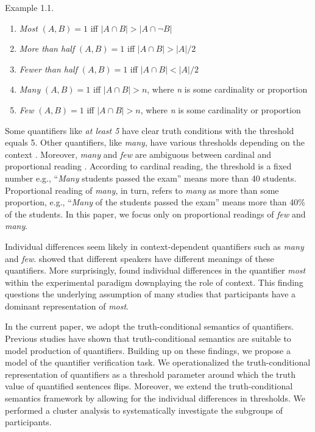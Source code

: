 \documentclass{article}
\begin{document}
\vspace{0.5cm}
Example 1.1.
\begin{enumerate} \label{ex:2.1} 
    \item \textit{Most} $(A, B) = 1$ iff $|A \cap B| > |A \cap \neg B|$
    \item \textit{More than half} $(A, B) = 1$ iff $|A \cap B| > |A|/2$
    \item \textit{Fewer than half} $(A, B) = 1$ iff $|A \cap B| < |A|/2$
    \item \textit{Many} $(A, B) = 1$ iff $|A \cap B| > n$, where \textit{n} is some cardinality or proportion
    \item \textit{Few} $(A, B) = 1$ iff $|A \cap B| > n$, where \textit{n} is some cardinality or proportion
\end{enumerate}

Some quantifiers like \textit{at least 5} have clear truth conditions with the threshold equals 5. Other quantifiers, like \textit{many}, have various thresholds depending on the context \cite{Scholler2016HowModels}. Moreover, \textit{many} and \textit{few} are ambiguous between cardinal and proportional reading \cite{Partee1988ManyQuantifiers}. According to cardinal reading, the threshold is a fixed number e.g., “\textit{Many} students passed the exam” means more than 40 students. Proportional reading of \textit{many}, in turn, refers to \textit{many} as more than some proportion, e.g., “\textit{Many} of the students passed the exam” means more than 40\% of the students. In this paper, we focus only on proportional readings of \textit{few} and \textit{many}.

Individual differences seem likely in context-dependent quantifiers such as \textit{many} and \textit{few}.  showed that different speakers have different meanings of these quantifiers. More surprisingly,  found individual differences in the quantifier \textit{most} within the experimental paradigm downplaying the role of context. This finding questions the underlying assumption of many studies \cite{Hackl2009, Pietroski2009, Lidz2011} that participants have a dominant representation of \textit{most}. 

In the current paper, we adopt the truth-conditional semantics of quantifiers. Previous studies have shown \cite{vanTiel2014Truthtypicality, vanTiel2021ProbabilisticQuantification} that truth-conditional semantics are suitable to model production of quantifiers. Building up on these findings, we propose a model of the quantifier verification task. We operationalized the truth-conditional representation of quantifiers as a threshold parameter around which the truth value of quantified sentences flips. Moreover, we extend the truth-conditional semantics framework by allowing for the individual differences in thresholds. We performed a cluster analysis to systematically investigate the subgroups of participants. 
\end{document}
